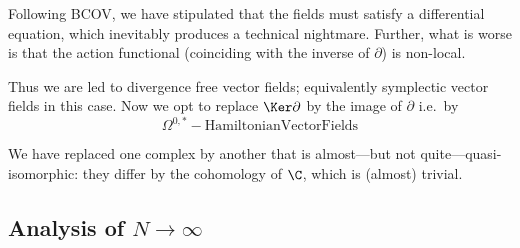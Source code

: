 \documentclass[12pt]{amsart}
\begin{document}
  \begin{rmk}
    Following BCOV, we have stipulated that the fields must satisfy a
    differential equation, which inevitably produces a technical nightmare.
    Further, what is worse is that the action functional (coinciding with the
    inverse of $\partial$) is non-local.
  \end{rmk}
  Thus we are led to divergence free vector fields; equivalently symplectic
  vector fields in this case. Now we opt to replace $\Ker\partial$ by the image
  of $\partial$ i.e.\ by $$\Omega^{0,*} - \mathrm{Hamiltonian Vector
  Fields}$$

  \begin{rmk}
    We have replaced one complex by another that is almost---but not
    quite---quasi-isomorphic: they differ by the cohomology of $\C$, which is
    (almost) trivial.
  \end{rmk}

  \subsection{Analysis of $N \rightarrow \infty$}
\end{document}
